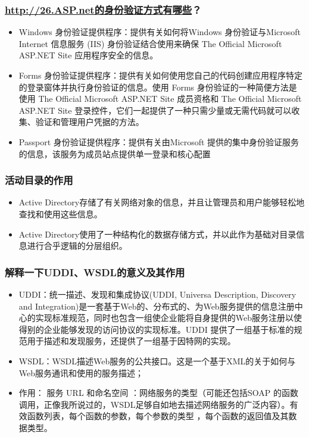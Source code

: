 \documentclass[9pt, b5paper]{article}
\begin{document}
\subsubsection{\url{http://26.ASP.net的身份验证方式有哪些}？}
\label{sec-1-2-114}
\begin{itemize}
\item Windows 身份验证提供程序：提供有关如何将Windows 身份验证与Microsoft Internet 信息服务 (IIS) 身份验证结合使用来确保 The Official Microsoft ASP.NET Site 应用程序安全的信息。
\item Forms 身份验证提供程序：提供有关如何使用您自己的代码创建应用程序特定的登录窗体并执行身份验证的信息。使用 Forms 身份验证的一种简便方法是使用 The Official Microsoft ASP.NET Site 成员资格和 The Official Microsoft ASP.NET Site 登录控件，它们一起提供了一种只需少量或无需代码就可以收集、验证和管理用户凭据的方法。
\item Passport 身份验证提供程序：提供有关由Microsoft 提供的集中身份验证服务的信息，该服务为成员站点提供单一登录和核心配置
\end{itemize}
\subsubsection{活动目录的作用}
\label{sec-1-2-115}
\begin{itemize}
\item Active Directory存储了有关网络对象的信息，并且让管理员和用户能够轻松地查找和使用这些信息。
\item Active Directory使用了一种结构化的数据存储方式，并以此作为基础对目录信息进行合乎逻辑的分层组织。
\end{itemize}
\subsubsection{解释一下UDDI、WSDL的意义及其作用}
\label{sec-1-2-116}
\begin{itemize}
\item UDDI：统一描述、发现和集成协议(UDDI, Universa Description, Discovery and Integration)是一套基于Web的、分布式的、为Web服务提供的信息注册中心的实现标准规范，同时也包含一组使企业能将自身提供的Web服务注册以使得别的企业能够发现的访问协议的实现标准。UDDI 提供了一组基于标准的规范用于描述和发现服务，还提供了一组基于因特网的实现。
\item WSDL：WSDL描述Web服务的公共接口。这是一个基于XML的关于如何与Web服务通讯和使用的服务描述；
\item 作用： 服务 URL 和命名空间 ：网络服务的类型（可能还包括SOAP 的函数调用，正像我所说过的，WSDL足够自如地去描述网络服务的广泛内容）。有效函数列表，每个函数的参数，每个参数的类型 ，每个函数的返回值及其数据类型。
\end{itemize}
\end{document}
